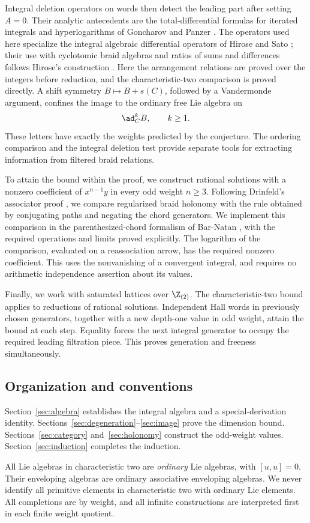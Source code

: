 Integral deletion operators on words then detect the leading part
after setting \(A=0\).  Their analytic antecedents are the
total-differential formulas for iterated integrals and hyperlogarithms
of Goncharov \cite[Theorem~2.1]{Goncharov} and
Panzer \cite[Lemma~3.3.30]{Panzer}.
The operators used here specialize the integral
algebraic differential operators of Hirose and Sato
\cite[Section~2]{HiroseSato}; their use with cyclotomic braid algebras
and ratios of sums and differences follows Hirose's construction
\cite[Sections~4.3 and~6]{Hirose}.  Here the arrangement relations are proved over the
integers before reduction, and the characteristic-two comparison is
proved directly.  A shift symmetry
\(B\mapsto B+s(C)\), followed by a Vandermonde argument, confines the
image to the ordinary free Lie algebra on
\[
 \ad_C^kB,\qquad k\ge1.
\]
These letters have exactly the weights predicted by the conjecture.
The ordering comparison and the integral deletion test provide
separate tools for extracting information from filtered braid
relations.

To attain the bound within the proof, we construct rational solutions with a nonzero
coefficient of \(x^{n-1}y\) in every odd weight \(n\ge3\).
Following Drinfeld's associator proof
\cite[Proposition~6.3]{Drinfeld}, we compare regularized braid holonomy
with the rule obtained by conjugating paths and negating the chord
generators.  We implement
this comparison in the parenthesized-chord formalism of Bar-Natan
\cite[Sections~2--3]{BarNatan}, with the required operations and
limits proved explicitly.  The logarithm of the comparison,
evaluated on a reassociation arrow, has the required nonzero
coefficient.  This uses the nonvanishing of a convergent integral,
and requires no arithmetic independence assertion about its values.

Finally, we work with saturated lattices over \(\Z_{(2)}\).
The characteristic-two bound applies to reductions of rational
solutions.  Independent Hall words in previously chosen generators,
together with a new depth-one value in odd weight, attain the bound
at each step.
Equality forces the next integral generator to occupy the required
leading filtration piece.  This proves generation and freeness
simultaneously.

\subsection{Organization and conventions}
Section~\ref{sec:algebra} establishes the integral algebra and a
special-derivation identity.  Sections~\ref{sec:degeneration}--\ref{sec:image}
prove the dimension bound.  Sections~\ref{sec:category}
and~\ref{sec:holonomy} construct the odd-weight values.
Section~\ref{sec:induction} completes the induction.

All Lie algebras in characteristic two are \emph{ordinary} Lie
algebras, with \([u,u]=0\).  Their enveloping algebras are ordinary
associative enveloping algebras.  We never identify all primitive
elements in characteristic two with ordinary Lie elements.
All completions are by weight, and all infinite constructions are
interpreted first in each finite weight quotient.
